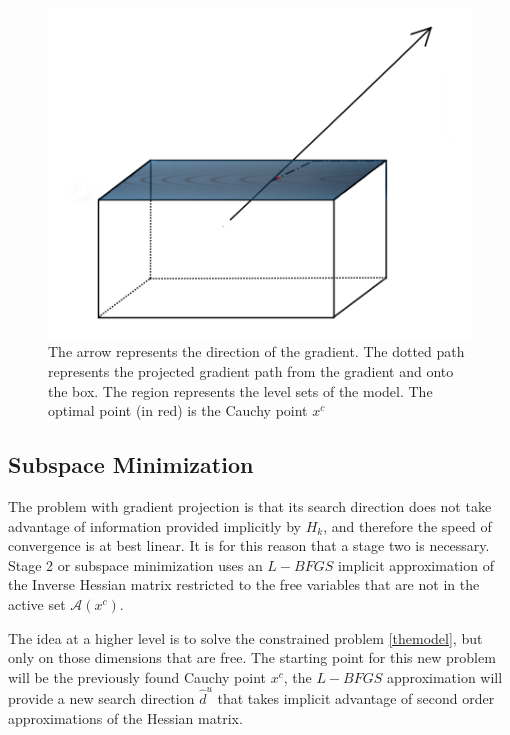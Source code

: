 \begin{figure}
\begin{center}
\includegraphics[scale=0.5]{Figures/cajapresentation2.png}
\caption[graph1]{The arrow represents the direction of the gradient. The dotted path represents the projected gradient path from the gradient and onto the box. The region represents the level sets of the model. The optimal point (in red) is the Cauchy point $x^c$}
\end{center}
\end{figure}

\subsection{Subspace Minimization}

The problem with gradient projection is that its search direction does not take advantage of information provided implicitly by $H_k$, and therefore the speed of convergence is at best linear. It is for this reason that a stage two is necessary. Stage 2 or subspace minimization uses an $L-BFGS$ implicit approximation of the Inverse Hessian matrix restricted to the free variables that are not in the active set $\mathcal{A}(x^c)$.

The idea at a higher level is to solve the constrained problem \ref{themodel}, but only on those dimensions that are free. The starting point for this new problem will be the previously found Cauchy point $x^c$, the $L-BFGS$ approximation will provide a new search direction $\hat{d}^u$ that takes implicit advantage of second order approximations of the Hessian matrix.

